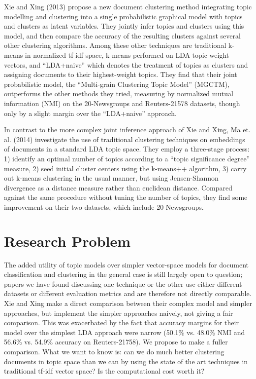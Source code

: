 \documentclass{sig-alternate-05-2015}
\begin{document}
\par
Xie and Xing (2013)\cite{jointinference} propose a new document clustering method integrating topic modelling and clustering into a single probabilistic graphical model with topics and clusters as latent variables. They jointly infer topics and clusters using this model, and then compare the accuracy of the resulting clusters against several other clustering algorithms. Among these other techniques are traditional k-means in normalized tf-idf space, k-means performed on LDA topic weight vectors, and ``LDA+naive'' which denotes the treatment of topics as clusters and assigning documents to their highest-weight topics.  They find that their joint probabilistic model, the ``Multi-grain Clustering Topic Model'' (MGCTM), outperforms the other methods they tried, measuring by normalized mutual information (NMI) on the 20-Newsgroups and Reuters-21578 datasets, though only by a slight margin over the ``LDA+naive'' approach.

In contrast to the more complex joint inference approach of Xie and Xing, Ma et. al. (2014)\cite{threestage} investigate the use of traditional clustering techniques on embeddings of documents in a standard LDA topic space.  They employ a three-stage process: 1) identify an optimal number of topics according to a ``topic significance degree'' measure, 2) seed initial cluster centers using the k-means++ algorithm, 3) carry out k-means clustering in the usual manner, but using Jensen-Shannon divergence as a distance measure rather than euclidean distance.  Compared against the same procedure without tuning the number of topics, they find some improvement on their two datasets, which include 20-Newsgroups.

\section{Research Problem}
The added utility of topic models over simpler vector-space models for document classification and clustering in the general case is still largely open to question; papers we have found discussing one technique or the other use either different datasets or different evaluation metrics and are therefore not directly comparable.  Xie and Xing make a direct comparison between their complex model and simpler approaches, but implement the simpler approaches naively, not giving a fair comparison.  This was exacerbated by the fact that accuracy margins for their model over the simplest LDA approach were narrow (50.1\% vs. 48.0\% NMI and 56.6\% vs. 54.9\% accuracy on Reuters-21758).  We propose to make a fuller comparison.  What we want to know is: can we do much better clustering documents in topic space than we can by using the state of the art techniques in traditional tf-idf vector space? Is the computational cost worth it?
\end{document}
